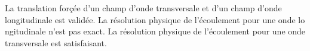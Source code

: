 La translation forçée d'un champ d'onde transversale et d'un champ d'onde longitudinale est validée. La résolution physique de l'écoulement pour une onde lo    ngitudinale n'est pas exact. La résolution physique de l'écoulement pour une onde transversale est satisfaisant.
